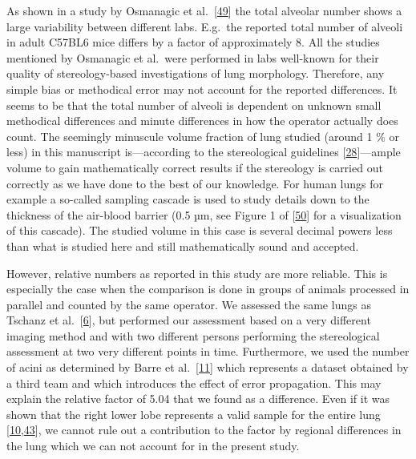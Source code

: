 \documentclass[
  american,
]{article}
\begin{document}
As shown in a study by Osmanagic et al.~{[}\protect\hyperlink{ref-LzalnLBH}{49}{]} the total alveolar number shows a large variability between different labs.
E.g.~the reported total number of alveoli in adult C57BL6 mice differs by a factor of approximately 8.
All the studies mentioned by Osmanagic et al.~were performed in labs well-known for their quality of stereology-based investigations of lung morphology.
Therefore, any simple bias or methodical error may not account for the reported differences.
It seems to be that the total number of alveoli is dependent on unknown small methodical differences and minute differences in how the operator actually does count.
The seemingly minuscule volume fraction of lung studied (around 1 \% or less) in this manuscript is---according to the stereological guidelines {[}\protect\hyperlink{ref-dNc8FfNn}{28}{]}---ample volume to gain mathematically correct results if the stereology is carried out correctly as we have done to the best of our knowledge.
For human lungs for example a so-called sampling cascade is used to study details down to the thickness of the air-blood barrier (0.5 µm, see Figure 1 of {[}\protect\hyperlink{ref-1CLJ32t5m}{50}{]} for a visualization of this cascade).
The studied volume in this case is several decimal powers less than what is studied here and still mathematically sound and accepted.

However, relative numbers as reported in this study are more reliable.
This is especially the case when the comparison is done in groups of animals processed in parallel and counted by the same operator.
We assessed the same lungs as Tschanz et al.~{[}\protect\hyperlink{ref-wnl86DEM}{6}{]}, but performed our assessment based on a very different imaging method and with two different persons performing the stereological assessment at two very different points in time.
Furthermore, we used the number of acini as determined by Barre et al.~{[}\protect\hyperlink{ref-uFNlWogb}{11}{]} which represents a dataset obtained by a third team and which introduces the effect of error propagation.
This may explain the relative factor of 5.04 that we found as a difference.
Even if it was shown that the right lower lobe represents a valid sample for the entire lung {[}\protect\hyperlink{ref-14OP85b2F}{10},\protect\hyperlink{ref-I9TmP6IU}{43}{]}, we cannot rule out a contribution to the factor by regional differences in the lung which we can not account for in the present study.
\end{document}
